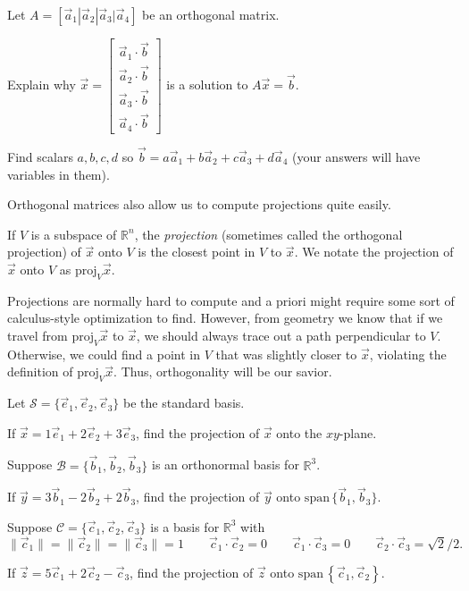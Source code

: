 \documentclass{problemset}
\newcommand{\R}{\mathbb{R}}
\newcommand{\proj}{\mathrm{proj}}
\renewcommand{\span}{\mathrm{span}\,}
\newcommand{\mat}[1]{\begin{bmatrix}#1\end{bmatrix}}
\begin{document}
	\question
	Let $A=[\vec a_1|\vec a_2|\vec a_3|\vec a_4]$ be an orthogonal matrix.
	\begin{parts}
		\item Explain why 
			$\vec x=\mat{\vec a_1\cdot \vec b\\
				     \vec a_2\cdot \vec b\\
			     	     \vec a_3\cdot \vec b\\
			     	     \vec a_4\cdot \vec b}$ is a solution to $A\vec x=\vec b$.
		\item Find scalars $a,b,c,d$ so $\vec b=a\vec a_1+b\vec a_2+c\vec a_3+d\vec a_4$
			(your answers will have variables in them).
	\end{parts}

	Orthogonal matrices also allow us to compute projections quite easily.

	\begin{definition}
		If $V$ is a subspace of $\R^n$, the \emph{projection}
		(sometimes called the orthogonal projection) of $\vec x$ onto $V$
		is the closest point in $V$ to $\vec x$. We notate the projection
		of $\vec x$ onto $V$ as $\proj_V\vec x$.
	\end{definition}

	Projections are normally hard to compute and a priori might require some sort
	of calculus-style optimization to find.  However, from geometry we know that 
	if we travel from $\proj_V \vec x$ to $\vec x$, we should always trace out a path
	perpendicular to $V$.  Otherwise, we could find a point in $V$ that was slightly closer
	to $\vec x$, violating the definition of $\proj_V \vec x$.  Thus, orthogonality
	will be our savior.

	\question
	Let $\mathcal S=\{\vec e_1,\vec e_2,\vec e_3\}$ be the standard basis.
	\begin{parts}
		\item If $\vec x=1\vec e_1+2\vec e_2+3\vec e_3$, find the projection of $\vec x$
			onto the $xy$-plane.
	\end{parts}
	Suppose $\mathcal B=\{\vec b_1,\vec b_2,\vec b_3\}$ is an orthonormal basis for $\R^3$.
	\begin{parts}[resume]
		\item If $\vec y=3\vec b_1-2\vec b_2+2\vec b_3$, find the projection of $\vec y$
			onto $\span\{\vec b_1,\vec b_3\}$.
	\end{parts}
	Suppose $\mathcal C=\{\vec c_1,\vec c_2,\vec c_3\}$ is a basis for $\R^3$ with
	\[
		\|\vec c_1\| = 
		\|\vec c_2\| = 
		\|\vec c_3\| = 1\qquad \vec c_1\cdot \vec c_2=0\qquad \vec c_1\cdot \vec c_3=0
		\qquad \vec c_2\cdot \vec c_3=\sqrt{2}/2.
	\]
	\vspace{-.35in}
	\begin{parts}[resume]
		\item If $\vec z=5\vec c_1+2\vec c_2-\vec c_3$, find the projection of $\vec z$
			onto $\span\left\{\vec c_1,\vec c_2\right\}$.
	\end{parts}
\end{document}
